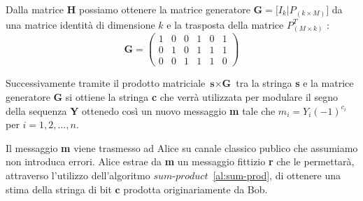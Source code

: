 Dalla matrice \textbf{H} possiamo ottenere la matrice generatore $\textbf{G} = \bigl [  I_{k} | P_{(k \times M)} \bigr ]$ da una matrice identit\`a di dimensione $k$ e la trasposta della matrice $P^T_{(M \times k)}$ :
\begin{equation}
\textbf{G} =
\begin{pmatrix}
 1 & 0 & 0 & 1 & 0 & 1 \\
 0 & 1 & 0 & 1 & 1 & 1 \\
 0 & 0 & 1 & 1 & 1 & 0
\end{pmatrix}
\end{equation}

Successivamente tramite il prodotto matriciale $\textbf{s} \times \textbf{G}$ tra la stringa \textbf{s} e la matrice generatore \textbf{G} si ottiene la stringa \textbf{c} che verr\`a utilizzata per modulare il segno della sequenza \textbf{Y} ottenedo cos\`i un nuovo messaggio \textbf{m} tale che $m_i = Y_i(-1)^{c_i}$ per $i = 1,2,\dots,n$.




Il messaggio \textbf{m} viene trasmesso ad Alice su canale classico publico che assumiamo non introduca errori. Alice estrae da \textbf{m} un messaggio fittizio \textbf{r} che le permettar\`a, attraverso l'utilizzo dell'algoritmo $\textit{sum-product}$~\ref{al:sum-prod}, di ottenere una stima della stringa di bit $\textbf{c}$ prodotta originariamente da Bob.

